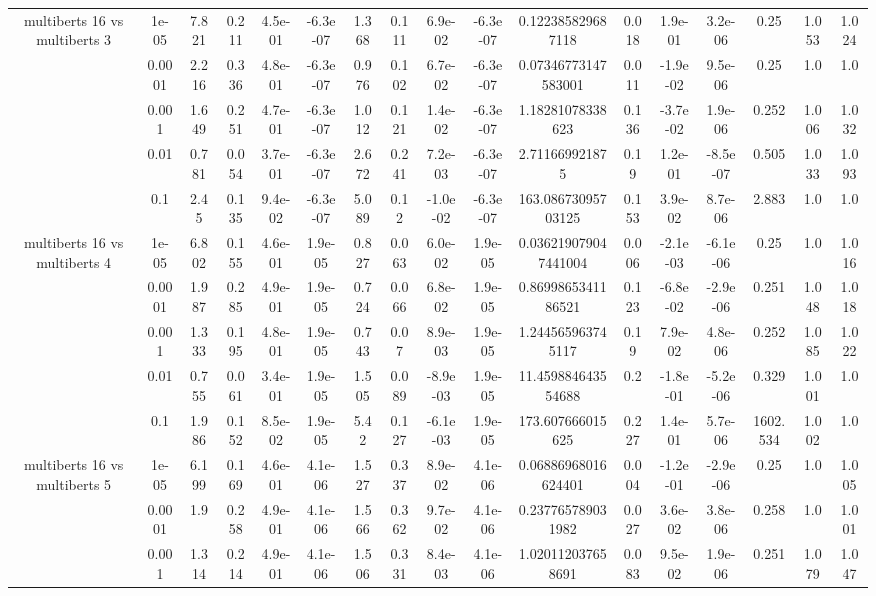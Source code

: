 \begin{tabular}{|c|c|c|c|c|c|c|c|c|c|c|c|c|c|c|c|c|}
\hline
\multirow{5}{*}{multiberts 16 vs multiberts 3} & 1e-05 & 7.821 & 0.211 & 4.5e-01 & -6.3e-07 & 1.368 & 0.111 & 6.9e-02 & -6.3e-07 & 0.122385829687118 & 0.018 & 1.9e-01 & 3.2e-06 & 0.25 & 1.053 & 1.024 \\
 & 0.0001 & 2.216 & 0.336 & 4.8e-01 & -6.3e-07 & 0.976 & 0.102 & 6.7e-02 & -6.3e-07 & 0.07346773147583001 & 0.011 & -1.9e-02 & 9.5e-06 & 0.25 & 1.0 & 1.0 \\
 & 0.001 & 1.649 & 0.251 & 4.7e-01 & -6.3e-07 & 1.012 & 0.121 & 1.4e-02 & -6.3e-07 & 1.18281078338623 & 0.136 & -3.7e-02 & 1.9e-06 & 0.252 & 1.006 & 1.032 \\
 & 0.01 & 0.781 & 0.054 & 3.7e-01 & -6.3e-07 & 2.672 & 0.241 & 7.2e-03 & -6.3e-07 & 2.711669921875 & 0.19 & 1.2e-01 & -8.5e-07 & 0.505 & 1.033 & 1.093 \\
 & 0.1 & 2.45 & 0.135 & 9.4e-02 & -6.3e-07 & 5.089 & 0.12 & -1.0e-02 & -6.3e-07 & 163.08673095703125 & 0.153 & 3.9e-02 & 8.7e-06 & 2.883 & 1.0 & 1.0 \\
\hline
\multirow{5}{*}{multiberts 16 vs multiberts 4} & 1e-05 & 6.802 & 0.155 & 4.6e-01 & 1.9e-05 & 0.827 & 0.063 & 6.0e-02 & 1.9e-05 & 0.036219079047441004 & 0.006 & -2.1e-03 & -6.1e-06 & 0.25 & 1.0 & 1.016 \\
 & 0.0001 & 1.987 & 0.285 & 4.9e-01 & 1.9e-05 & 0.724 & 0.066 & 6.8e-02 & 1.9e-05 & 0.8699865341186521 & 0.123 & -6.8e-02 & -2.9e-06 & 0.251 & 1.048 & 1.018 \\
 & 0.001 & 1.333 & 0.195 & 4.8e-01 & 1.9e-05 & 0.743 & 0.07 & 8.9e-03 & 1.9e-05 & 1.244565963745117 & 0.19 & 7.9e-02 & 4.8e-06 & 0.252 & 1.085 & 1.022 \\
 & 0.01 & 0.755 & 0.061 & 3.4e-01 & 1.9e-05 & 1.505 & 0.089 & -8.9e-03 & 1.9e-05 & 11.459884643554688 & 0.2 & -1.8e-01 & -5.2e-06 & 0.329 & 1.001 & 1.0 \\
 & 0.1 & 1.986 & 0.152 & 8.5e-02 & 1.9e-05 & 5.42 & 0.127 & -6.1e-03 & 1.9e-05 & 173.607666015625 & 0.227 & 1.4e-01 & 5.7e-06 & 1602.534 & 1.002 & 1.0 \\
\hline
\multirow{5}{*}{multiberts 16 vs multiberts 5} & 1e-05 & 6.199 & 0.169 & 4.6e-01 & 4.1e-06 & 1.527 & 0.337 & 8.9e-02 & 4.1e-06 & 0.06886968016624401 & 0.004 & -1.2e-01 & -2.9e-06 & 0.25 & 1.0 & 1.005 \\
 & 0.0001 & 1.9 & 0.258 & 4.9e-01 & 4.1e-06 & 1.566 & 0.362 & 9.7e-02 & 4.1e-06 & 0.237765789031982 & 0.027 & 3.6e-02 & 3.8e-06 & 0.258 & 1.0 & 1.001 \\
 & 0.001 & 1.314 & 0.214 & 4.9e-01 & 4.1e-06 & 1.506 & 0.331 & 8.4e-03 & 4.1e-06 & 1.020112037658691 & 0.083 & 9.5e-02 & 1.9e-06 & 0.251 & 1.079 & 1.047 \\

\end{tabular}
